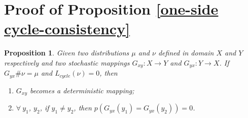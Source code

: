 \documentclass[runningheads]{llncs}
\newtheorem{prop}{Proposition}
\begin{document}
\appendix
\setcounter{prop}{0}

\section{Proof of Proposition \ref{one-side cycle-consistency}}

\begin{prop}
	\label{one-side cycle-consistency_appendix}
	Given two distributions $\mu$ and $\nu$ defined in domain $X$ and $Y$ respectively and two stochastic mappings $G_{xy}: X \rightarrow Y $ and $G_{yx}: Y \rightarrow X$. If $G_{yx}\#\nu = \mu$ and $L_{cycle}(\nu)=0$, then 
	\begin{enumerate}
		\item $G_{xy}$ becomes a deterministic mapping;
		\item $\forall ~ y_1$, $y_2$, if $y_1 \neq y_2$, then $p(G_{yx}(y_1)=G_{yx}(y_2))=0$.
	\end{enumerate}
\end{prop}
\end{document}
